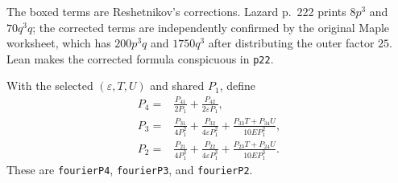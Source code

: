 \documentclass[11pt,a4paper,oneside]{article}
\newcommand{\lean}[1]{\nolinkurl{#1}}
\newcommand{\eps}{\varepsilon}
\begin{document}
The boxed terms are Reshetnikov's corrections.  Lazard p.~222 prints $8p^3$
and $70q^3q$; the corrected terms are independently confirmed by the original
Maple worksheet, which has $200p^3q$ and $1750q^3$ after distributing the
outer factor $25$.  Lean makes the corrected formula conspicuous in
\lean{p22}.

With the selected $(\eps,T,U)$ and shared $P_1$, define
\begin{align*}
P_4={}&\frac{P_{41}}{2P_1}+\frac{P_{42}}{2\eps P_1},\\
P_3={}&\frac{P_{31}}{4P_1^2}+\frac{P_{32}}{4\eps P_1^2}
 +\frac{P_{33}T+P_{34}U}{10EP_1^2},\\
P_2={}&\frac{P_{21}}{4P_1^3}+\frac{P_{22}}{4\eps P_1^3}
 +\frac{P_{23}T+P_{24}U}{10EP_1^3}.
\end{align*}
These are \lean{fourierP4}, \lean{fourierP3}, and \lean{fourierP2}.
\end{document}
